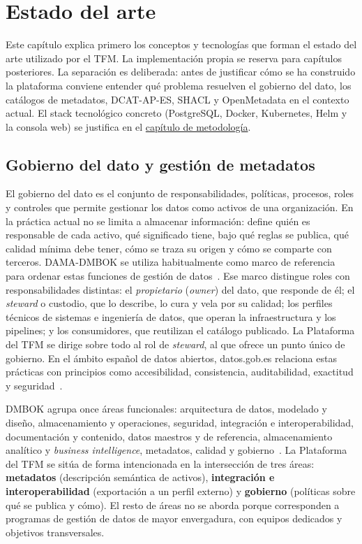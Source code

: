 \chapter{Estado del arte}\label{cap:estado-arte}

Este capítulo explica primero los conceptos y tecnologías que forman el estado del arte utilizado por el TFM. La implementación propia se reserva para capítulos posteriores. La separación es deliberada: antes de justificar cómo se ha construido la plataforma conviene entender qué problema resuelven el gobierno del dato, los catálogos de metadatos, DCAT-AP-ES, SHACL y OpenMetadata en el contexto actual. El stack tecnológico concreto (PostgreSQL, Docker, Kubernetes, Helm y la consola web) se justifica en el \hyperref[cap:metodologia]{capítulo de metodología}.

\section{Gobierno del dato y gestión de metadatos}\label{sec:gobierno-dato}

El gobierno del dato es el conjunto de responsabilidades, políticas, procesos, roles y controles que permite gestionar los datos como activos de una organización. En la práctica actual no se limita a almacenar información: define quién es responsable de cada activo, qué significado tiene, bajo qué reglas se publica, qué calidad mínima debe tener, cómo se traza su origen y cómo se comparte con terceros. \ac{DAMA}-\ac{DMBOK} se utiliza habitualmente como marco de referencia para ordenar estas funciones de gestión de datos~\cite{damaDmbok}. Ese marco distingue roles con responsabilidades distintas: el \emph{propietario} (\emph{owner}) del dato, que responde de él; el \emph{steward} o custodio, que lo describe, lo cura y vela por su calidad; los perfiles técnicos de sistemas e ingeniería de datos, que operan la infraestructura y los pipelines; y los consumidores, que reutilizan el catálogo publicado. La Plataforma del TFM se dirige sobre todo al rol de \emph{steward}, al que ofrece un punto único de gobierno. En el ámbito español de datos abiertos, datos.gob.es relaciona estas prácticas con principios como accesibilidad, consistencia, auditabilidad, exactitud y seguridad~\cite{datosGobDama2021}.

\ac{DMBOK} agrupa once áreas funcionales: arquitectura de datos, modelado y diseño, almacenamiento y operaciones, seguridad, integración e interoperabilidad, documentación y contenido, datos maestros y de referencia, almacenamiento analítico y \emph{business intelligence}, metadatos, calidad y gobierno~\cite{damaDmbok}. La Plataforma del TFM se sitúa de forma intencionada en la intersección de tres áreas: \textbf{metadatos} (descripción semántica de activos), \textbf{integración e interoperabilidad} (exportación a un perfil externo) y \textbf{gobierno} (políticas sobre qué se publica y cómo). El resto de áreas no se aborda porque corresponden a programas de gestión de datos de mayor envergadura, con equipos dedicados y objetivos transversales.

